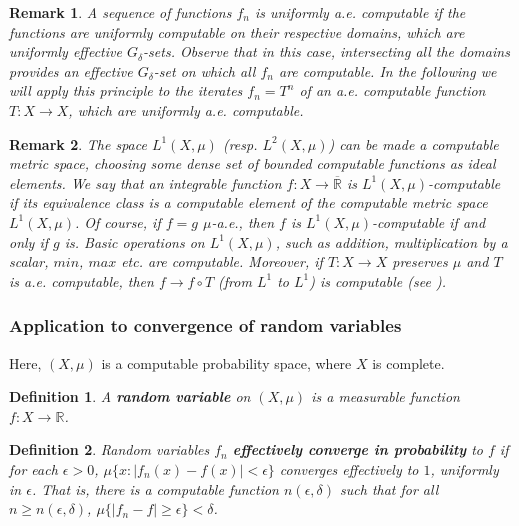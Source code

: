\documentclass[copyright,creativecommons]{eptcs}
\newtheorem{definition}{Definition}
\newtheorem{remark}{Remark}
\numberwithin{equation}{section}
\begin{document}
\begin{remark}
\label{com_sum} A sequence of functions $f_{n}$ is uniformly a.e. computable
if the functions are uniformly computable on their respective domains, which
are uniformly effective $G_{\delta }$-sets. Observe that in this case,
intersecting all the domains provides an effective $G_{\delta }$-set on
which all $f_{n}$ are computable. In the following we will apply this
principle to the iterates $f_{n}=T^{n}$ of an a.e. computable function $T:X\rightarrow X$, which are uniformly a.e. computable.
\end{remark}

\begin{remark}\label{l1comp}
The space $L^1(X,\mu)$ (resp. $L^2(X,\mu)$) can be made a computable metric
space, choosing some dense set of bounded computable functions as ideal
elements. We say that an integrable function $f:X\to\overline{\mathbb{R}}$
is $L^1(X,\mu)$-computable if its equivalence class is a computable element
of the computable metric space $L^1(X,\mu)$. Of course, if $f=g$ $\mu$-a.e.,
then $f$ is $L^1(X,\mu)$-computable if and only if $g$ is. Basic operations
on $L^1(X,\mu)$, such as addition, multiplication by a scalar, $min$, $max$ etc. are computable. Moreover, if $T:X\to X$ preserves $\mu$ and $T$ is a.e. computable, then $f\to f\circ T$ (from $L^1$ to $L^1$) is computable  (see \cite{HoyRojCiE09}).
\end{remark}

\subsubsection{Application to convergence of random variables}

Here, $(X,\mu)$ is a computable probability space, where $X$ is complete.

\begin{definition}
A \textbf{\emph{random variable}} on $(X,\mu)$ is a measurable function $f:X\to \mathbb{R}$.
\end{definition}

\begin{definition}
Random variables $f_n$ \textbf{\emph{effectively converge in probability}}
to $f$ if for each $\epsilon>0$, $\mu\{x: |f_n(x)-f(x)|<\epsilon\}$
converges effectively to $1$, uniformly in $\epsilon$. That is, there is a
computable function $n(\epsilon,\delta)$ such that for all $n\geq
n(\epsilon,\delta)$, $\mu\{|f_n-f|\geq\epsilon\}<\delta$.
\end{definition}
\end{document}
